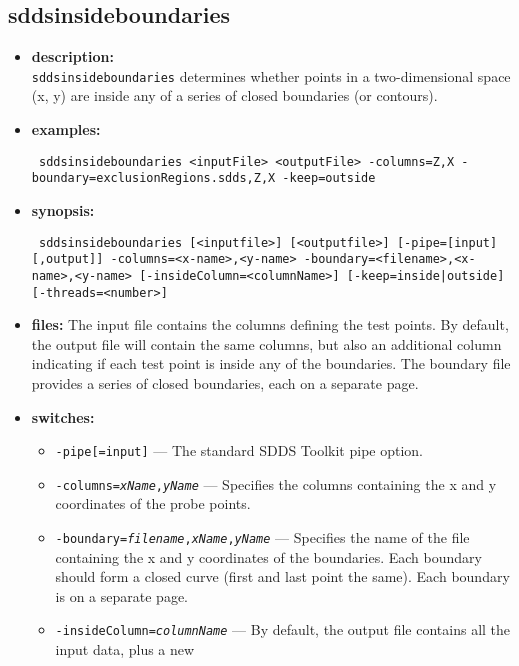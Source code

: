 \newpage 
\subsection{sddsinsideboundaries} 
\label{sddsinsideboundaries} 
 
\begin{itemize} 
\item {\bf description:} \hspace*{1mm}\\ 
{\tt sddsinsideboundaries} determines whether points in a two-dimensional space (x, y) are inside any of a
series of closed boundaries (or contours).
\item {\bf examples:} 
\begin{flushleft}{\tt
   sddsinsideboundaries <inputFile> <outputFile> -columns=Z,X -boundary=exclusionRegions.sdds,Z,X -keep=outside
}\end{flushleft} 
\item {\bf synopsis:}  
\begin{flushleft}{\tt 
sddsinsideboundaries [<inputfile>] [<outputfile>] [-pipe=[input][,output]]
-columns=<x-name>,<y-name>
-boundary=<filename>,<x-name>,<y-name>
[-insideColumn=<columnName>]
[-keep={inside|outside}] [-threads=<number>]
}\end{flushleft} 
\item {\bf files:} 
The input file contains the columns defining the test points. By default, the output file will contain the same columns,
but also an additional column indicating if each test point is inside any of the boundaries.
The boundary file provides a series of closed boundaries, each on a separate page.
\item {\bf switches:} 
  \begin{itemize} 
  \item {\tt -pipe[=input]} --- The standard SDDS Toolkit pipe option. 
  \item {\tt -columns={\em xName},{\em yName}} ---
    Specifies the columns containing the x and y coordinates of the probe points.
  \item {\tt -boundary={\em filename},{\em xName},{\em yName}} --- Specifies the name of the file containing the
    x and y coordinates of the boundaries. Each boundary should form a closed curve (first and last point the same).
    Each boundary is on a separate page.
  \item {\tt -insideColumn={\em columnName}} --- By default, the output file contains all the input data, plus a new

\end{itemize}
\end{itemize}
